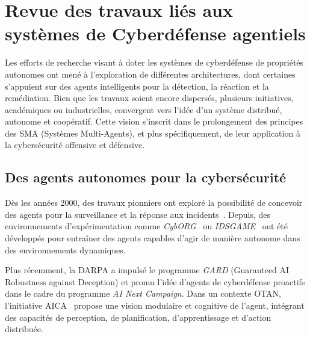 \documentclass[ twoside,openright,titlepage,numbers=noenddot,headinclude,%
                footinclude=true,cleardoublepage=empty,abstractoff, %
                BCOR=5mm,paper=a4,fontsize=11pt,%
                french,american,%
                ]{scrreprt}
\begin{document}
\section{Revue des travaux liés aux systèmes de Cyberdéfense agentiels}\label{sec:revue-cyberdef-agent}

Les efforts de recherche visant à doter les systèmes de cyberdéfense de propriétés autonomes ont mené à l'exploration de différentes architectures, dont certaines s'appuient sur des agents intelligents pour la détection, la réaction et la remédiation. Bien que les travaux soient encore dispersés, plusieurs initiatives, académiques ou industrielles, convergent vers l'idée d'un système distribué, autonome et coopératif. Cette vision s'inscrit dans le prolongement des principes des SMA (Systèmes Multi-Agents), et plus spécifiquement, de leur application à la cybersécurité offensive et défensive.

\subsection*{Des agents autonomes pour la cybersécurité}

Dès les années 2000, des travaux pionniers ont exploré la possibilité de concevoir des agents pour la surveillance et la réponse aux incidents~\cite{Jansen2000}. Depuis, des environnements d'expérimentation comme \emph{CybORG}~\cite{Mature2021} ou \emph{IDSGAME}~\cite{Shamshirband2020} ont été développés pour entraîner des agents capables d'agir de manière autonome dans des environnements dynamiques.

Plus récemment, la DARPA a impulsé le programme \emph{GARD} (Guaranteed AI Robustness against Deception) et promu l'idée d'agents de cyberdéfense proactifs dans le cadre du programme \emph{AI Next Campaign}. Dans un contexte OTAN, l'initiative AICA~\cite{AICAReport2021, AICAGuide2022} propose une vision modulaire et cognitive de l'agent, intégrant des capacités de perception, de planification, d'apprentissage et d'action distribuée.
\end{document}
